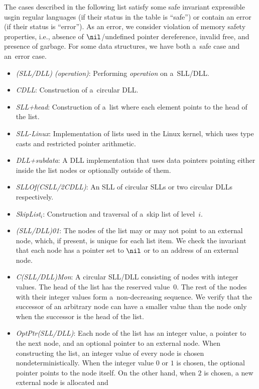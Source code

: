 {The cases described in the following list satisfy some 
safe invariant expressible usgin regular languages (if their status in the table is ``safe'') or contain an error
(if their status is ``error'').
As an error, we consider violation of memory safety properties, i.e.,  absence
of $\nil$/undefined pointer dereference, invalid free, and presence of garbage.
For some data structures, we have both a~safe case and an~error case.
%
\begin{itemize}
  \item \emph{(SLL/DLL) (operation)}: Performing \emph{operation} on a~SLL/DLL.
  \item \emph{CDLL}: Construction of a~circular DLL.
  \item \emph{SLL+head}: Construction of a~list where each element points to
    the head of the list.
  \item \emph{SLL-Linux}: Implementation of lists used in the Linux kernel,
    which uses type casts and restricted pointer arithmetic.
  \item \emph{DLL+subdata}: A DLL implementation that uses data pointers
    pointing either inside the list nodes or optionally outside of them.
  \item \emph{SLLOf(CSLL/2CDLL)}: An SLL of circular SLLs or two circular DLLs
    respectively.
  \item \emph{SkipList$_i$}: Construction and traversal of a~skip
    list of level~$i$.
  \item \emph{(SLL/DLL)01}: The nodes of the list may or may not point to
    an external node, which, if present, is unique for each list item.
    We check the invariant that each node has a pointer set to $\nil$ or
    to an address of an external node.
  \item \emph{C(SLL/DLL)Mon}: A circular SLL/DLL consisting of nodes with integer values.
    The head of the list has the reserved value~$0$. The rest of the nodes with their integer values
    form a~non-decreasing sequence. We verify that the successor of an arbitrary node
    can have a smaller value than the node only when the successor is the head of the list.
  \item \emph{OptPtr(SLL/DLL)}: Each node of the list has an integer value, a pointer to the next node,
    and an optional pointer to an external node. When constructing the list, an integer value of every node
    is chosen nondeterministically. When the integer value $0$ or $1$ is chosen, the optional pointer points
    to the node itself. On the other hand, when $2$ is chosen, a new external node is allocated and

\end{itemize}}
